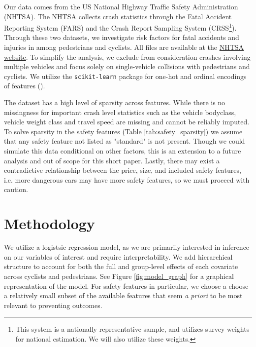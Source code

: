 \documentclass[12pt]{article}
\begin{document}
Our data comes from the US National Highway Traffic Safety Administration (NHTSA). The NHTSA collects
crash statistics through the Fatal Accident Reporting System (FARS) and the Crash Report
Sampling System (CRSS\footnote{This system is a nationally representative sample, and utilizes survey weights for national estimation. We will also utilize these weights.}). Through these two datasets, we investigate risk factors for fatal accidents and injuries in among pedestrians and cyclists. All files are available at the
    \href{https://www.nhtsa.gov/file-downloads?p=nhtsa/downloads/}{NHTSA website}. To simplify the analysis, we exclude from consideration crashes involving multiple vehicles and focus solely 
on single-vehicle collisions with pedestrians and cyclists. We utilize the \texttt{scikit-learn} 
package for one-hot and ordinal encodings of features (\cite{pedregosa_scikit-learn_2011}).

The dataset has a high level of sparsity across features. While there is no missingness for important crash level statistics such as the vehicle bodyclass, vehicle weight class and travel speed
are missing and cannot be reliably imputed. To solve sparsity in the safety features (Table \ref{tab:safety_sparsity}) we assume that any safety feature not listed as "standard" is not present. 
Though we could simulate this data conditional on other factors, this is an extension to a future analysis and out of scope for this short paper. Lastly, there may exist a contradictive relationship between
the price, size, and included safety features, i.e. more dangerous cars may have
more safety features, so we must proceed with caution.

\section{Methodology}

We utilize a logistsic regression model, as we are primarily interested in 
inference on our variables of interest and require interpretability. We 
add hierarchical structure to account for both the full and group-level effects 
of each covariate across cyclists and pedestrians. See Figure \ref{fig:model_graph} for a graphical representation of the model. For safety
features in particular, we choose a choose a relatively small subset of the available features that seem 
\textit{a priori} to be most relevant to preventing outcomes. 
\end{document}
